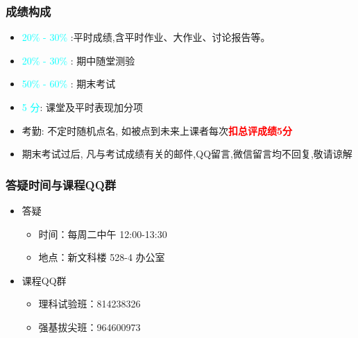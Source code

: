 \begin{frame}
	\frametitle{成绩构成}
	\begin{itemize}[<+-|alert@+>]
		\item {\rm  \textcolor{cyan}{20\% - 30\%}} :平时成绩,含平时作业、大作业、讨论报告等。
		\item  {\rm  \textcolor{cyan}{20\% - 30\%}}  : 期中随堂测验
		\item  {\rm  \textcolor{cyan}{50\% - 60\%}} : 期末考试
		\item \textcolor{cyan}{5 分}: 课堂及平时表现加分项
		\item 考勤: 不定时随机点名, 如被点到未来上课者每次\textcolor{red}{\bf 扣总评成绩5分}
		\item 期末考试过后, 凡与考试成绩有关的邮件,QQ留言,微信留言均不回复,敬请谅解
	\end{itemize}
\end{frame}

\begin{frame}
	\frametitle{答疑时间与课程{\rm QQ}群}
	\begin{itemize}[<+-|alert@+>]
		\item 答疑
		\begin{itemize}[<+-|alert@+>]
			\item 时间：每周二中午 12:00-13:30
			\item 地点：新文科楼 528-4 办公室
		\end{itemize}
		\item 课程{\rm QQ}群
		\begin{itemize}[<+-|alert@+>]
			\item 理科试验班：814238326
			\item 强基拔尖班：964600973
			\end{itemize}
	\end{itemize}
\end{frame}





